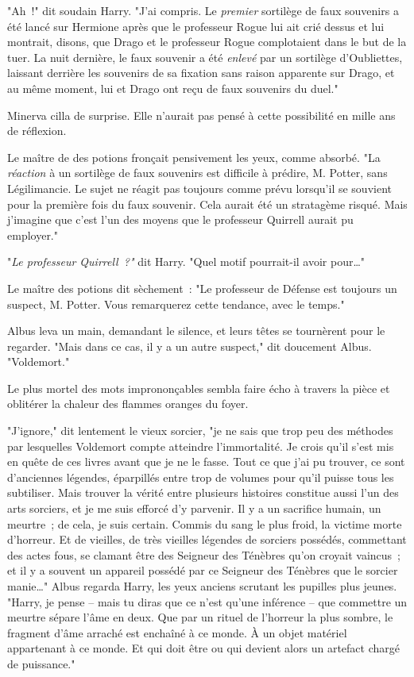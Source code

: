 "Ah~!" dit soudain Harry. "J'ai compris. Le \emph{premier} sortilège de faux souvenirs a été lancé sur Hermione après que le professeur Rogue lui ait crié dessus et lui montrait, disons, que Drago et le professeur Rogue complotaient dans le but de la tuer. La nuit dernière, le faux souvenir a été \emph{enlevé} par un sortilège d'Oubliettes, laissant derrière les souvenirs de sa fixation sans raison apparente sur Drago, et au même moment, lui et Drago ont reçu de faux souvenirs du duel."

Minerva cilla de surprise. Elle n'aurait pas pensé à cette possibilité en mille ans de réflexion.

Le maître de des potions fronçait pensivement les yeux, comme absorbé. "La \emph{réaction} à un sortilège de faux souvenirs est difficile à prédire, M. Potter, sans Légilimancie. Le sujet ne réagit pas toujours comme prévu lorsqu'il se souvient pour la première fois du faux souvenir. Cela aurait été un stratagème risqué. Mais j'imagine que c'est l'un des moyens que le professeur Quirrell aurait pu employer."

"\emph{Le professeur Quirrell~?"} dit Harry. "Quel motif pourrait-il avoir pour…"

Le maître des potions dit sèchement~: "Le professeur de Défense est toujours un suspect, M. Potter. Vous remarquerez cette tendance, avec le temps."

Albus leva un main, demandant le silence, et leurs têtes se tournèrent pour le regarder. "Mais dans ce cas, il y a un autre suspect," dit doucement Albus. "Voldemort."

Le plus mortel des mots imprononçables sembla faire écho à travers la pièce et oblitérer la chaleur des flammes oranges du foyer.

"J'ignore," dit lentement le vieux sorcier, "je ne sais que trop peu des méthodes par lesquelles Voldemort compte atteindre l'immortalité. Je crois qu'il s'est mis en quête de ces livres avant que je ne le fasse. Tout ce que j'ai pu trouver, ce sont d'anciennes légendes, éparpillés entre trop de volumes pour qu'il puisse tous les subtiliser. Mais trouver la vérité entre plusieurs histoires constitue aussi l'un des arts sorciers, et je me suis efforcé d'y parvenir. Il y a un sacrifice humain, un meurtre~; de cela, je suis certain. Commis du sang le plus froid, la victime morte d'horreur. Et de vieilles, de très vieilles légendes de sorciers possédés, commettant des actes fous, se clamant être des Seigneur des Ténèbres qu'on croyait vaincus~; et il y a souvent un appareil possédé par ce Seigneur des Ténèbres que le sorcier manie…" Albus regarda Harry, les yeux anciens scrutant les pupilles plus jeunes. "Harry, je pense -- mais tu diras que ce n'est qu'une inférence -- que commettre un meurtre sépare l'âme en deux. Que par un rituel de l'horreur la plus sombre, le fragment d'âme arraché est enchaîné à ce monde. À un objet matériel appartenant à ce monde. Et qui doit être ou qui devient alors un artefact chargé de puissance."

